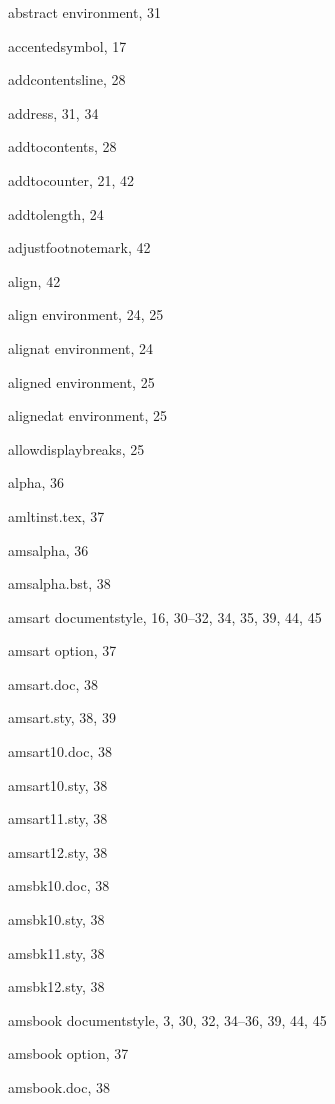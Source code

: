 \begin{theindex}
  \item {\ptt {}abstract} environment, 31
  \item {\ptt \bslash accentedsymbol}, 17
  \item {\ptt \bslash addcontentsline}, 28
  \item {\ptt \bslash address}, 31, 34
  \item {\ptt \bslash addtocontents}, 28
  \item {\ptt \bslash addtocounter}, 21, 42
  \item {\ptt \bslash addtolength}, 24
  \item {\ptt \bslash adjustfootnotemark}, 42
  \item {\ptt \bslash align}, 42
  \item {\ptt {}align} environment, 24, 25
  \item {\ptt {}alignat} environment, 24
  \item {\ptt {}aligned} environment, 25
  \item {\ptt {}alignedat} environment, 25
  \item {\ptt \bslash allowdisplaybreaks}, 25
  \item {\ptt {}alpha}, 36
  \item {\ptt {}amltinst.tex}, 37
  \item {\ptt {}amsalpha}, 36
  \item {\ptt {}amsalpha.bst}, 38
  \item {\ptt {}amsart} documentstyle, 16, 30--32, 34, 35, 39, 44, 45
  \item {\ptt {}amsart} option, 37
  \item {\ptt {}amsart.doc}, 38
  \item {\ptt {}amsart.sty}, 38, 39
  \item {\ptt {}amsart10.doc}, 38
  \item {\ptt {}amsart10.sty}, 38
  \item {\ptt {}amsart11.sty}, 38
  \item {\ptt {}amsart12.sty}, 38
  \item {\ptt {}amsbk10.doc}, 38
  \item {\ptt {}amsbk10.sty}, 38
  \item {\ptt {}amsbk11.sty}, 38
  \item {\ptt {}amsbk12.sty}, 38
  \item {\ptt {}amsbook} documentstyle, 3, 30, 32, 34--36, 39, 44, 45
  \item {\ptt {}amsbook} option, 37
  \item {\ptt {}amsbook.doc}, 38

\end{theindex}
